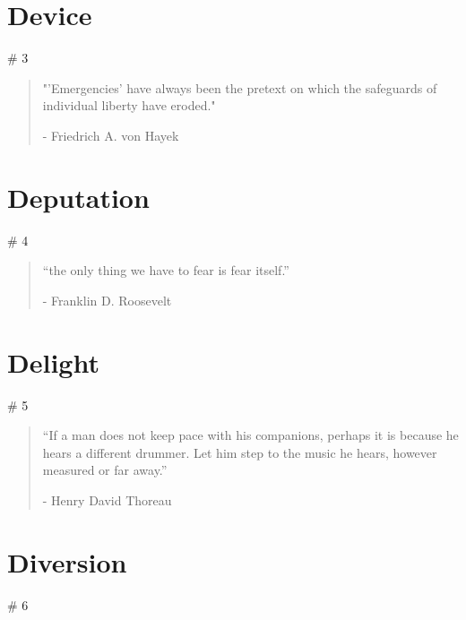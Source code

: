 \chapter{Device} # 3

\vspace{-1.3cm}
\begin{localsize}{10}
	\begin{quote}
		"'Emergencies' have always been the pretext on which the safeguards of individual liberty have eroded."
		\begin{flushright}- Friedrich A. von Hayek\end{flushright}
	\end{quote} 
\end{localsize}
\vspace{1cm}


\chapter{Deputation} # 4

\vspace{-1.3cm}
\begin{localsize}{10}
	\begin{quote}
		“the only thing we have to fear is fear itself.”
		\begin{flushright}- Franklin D. Roosevelt \end{flushright}
	\end{quote} 
\end{localsize}
\vspace{1cm}

\chapter{Delight} # 5

\vspace{-1.3cm}
\begin{localsize}{10}
	\begin{quote}
		“If a man does not keep pace with his companions, perhaps it is because he hears a different drummer. Let him step to the music he hears, however measured or far away.”
		\begin{flushright}- Henry David Thoreau \end{flushright}
	\end{quote} 
\end{localsize}
\vspace{1cm}

\chapter{Diversion} # 6


